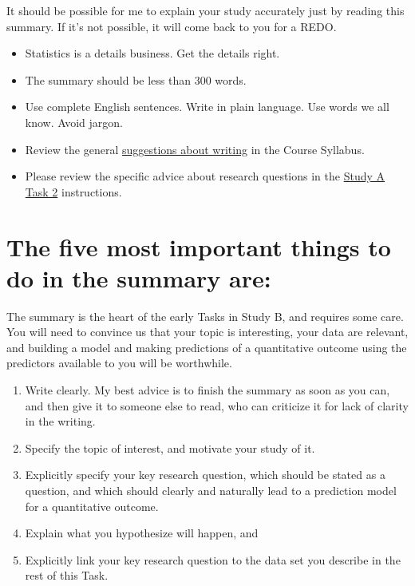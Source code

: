 \documentclass[]{book}
\providecommand{\tightlist}{%
  \setlength{\itemsep}{0pt}\setlength{\parskip}{0pt}}
\begin{document}
It should be possible for me to explain your study accurately just by reading this summary. If it's not possible, it will come back to you for a REDO.

\begin{itemize}
\tightlist
\item
  Statistics is a details business. Get the details right.
\item
  The summary should be less than 300 words.
\item
  Use complete English sentences. Write in plain language. Use words we all know. Avoid jargon.
\item
  Review the general \href{https://thomaselove.github.io/2019-431-syllabus/on-writing-presenting-communicating.html}{suggestions about writing} in the Course Syllabus.
\item
  Please review the specific advice about research questions in the \protect\hyperlink{task2a}{Study A Task 2} instructions.
\end{itemize}

\hypertarget{the-five-most-important-things-to-do-in-the-summary-are}{%
\section{The five most important things to do in the summary are:}\label{the-five-most-important-things-to-do-in-the-summary-are}}

The summary is the heart of the early Tasks in Study B, and requires some care. You will need to convince us that your topic is interesting, your data are relevant, and building a model and making predictions of a quantitative outcome using the predictors available to you will be worthwhile.

\begin{enumerate}
\def\labelenumi{\arabic{enumi}.}
\tightlist
\item
  Write clearly. My best advice is to finish the summary as soon as you can, and then give it to someone else to read, who can criticize it for lack of clarity in the writing.
\item
  Specify the topic of interest, and motivate your study of it.
\item
  Explicitly specify your key research question, which should be stated as a question, and which should clearly and naturally lead to a prediction model for a quantitative outcome.
\item
  Explain what you hypothesize will happen, and
\item
  Explicitly link your key research question to the data set you describe in the rest of this Task.
\end{enumerate}
\end{document}
